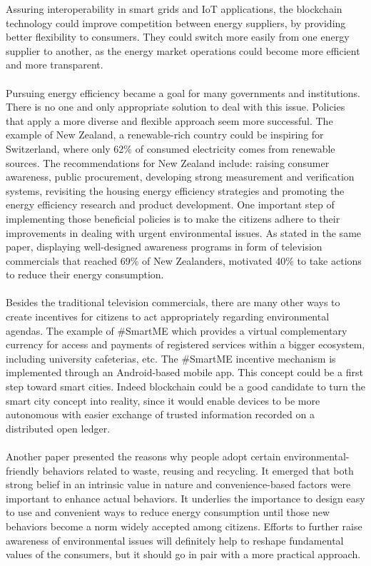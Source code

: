 \documentclass[11pt]{article}
\begin{document}
Assuring interoperability in smart grids and IoT applications, the blockchain technology could improve competition between energy suppliers, by providing better flexibility to consumers. They could switch more easily from one energy supplier to another, as the energy market operations could become more efficient and more transparent.\cite{12}\\\\
Pursuing energy efficiency became a goal for many governments and institutions. There is no one and only appropriate solution to deal with this issue. Policies that apply a more diverse and flexible approach seem more successful. The example of New Zealand, a renewable-rich country could be inspiring for Switzerland, where only 62\% of consumed electricity comes from renewable sources\cite{13}. The recommendations for New Zealand include: raising consumer awareness, public procurement, developing strong measurement and verification systems, revisiting the housing energy efficiency strategies and promoting the energy efficiency research and product development. One important step of implementing those beneficial policies is to make the citizens adhere to their improvements in dealing with urgent environmental issues. As stated in the same paper, displaying well-designed awareness programs in form of television commercials that reached 69\% of New Zealanders, motivated 40\% to take actions to reduce their energy consumption. \cite{14}\\\\
Besides the traditional television commercials, there are many other ways to create incentives for citizens to act appropriately regarding environmental agendas. The example of \#SmartME which provides a virtual complementary currency for access and payments of registered services within a bigger ecosystem, including university cafeterias, etc. The \#SmartME incentive mechanism is implemented through an Android-based mobile app. This concept could be a first step toward smart cities. Indeed blockchain could be a good candidate to turn the smart city concept into reality, since it would enable devices to be more autonomous with easier exchange of trusted information recorded on a distributed open ledger.\cite{15}\\\\
Another paper presented the reasons why people adopt certain environmental-friendly behaviors related to waste, reusing and recycling. It emerged that both strong belief in an intrinsic value in nature and convenience-based factors were important to enhance actual behaviors. It underlies the importance to design easy to use and convenient ways to reduce energy consumption until those new behaviors become a norm widely accepted among citizens. Efforts to further raise awareness of environmental issues will definitely help to reshape fundamental values of the consumers, but it should go in pair with a more practical approach.\cite{16}\\\\
\end{document}
